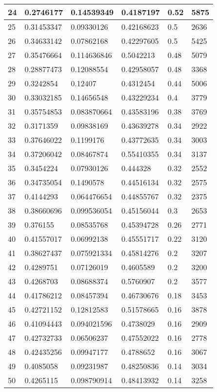 \begin{longtable}{|l|l|l|l|l|l|}
24 & 0.2746177 & 0.14539349 & 0.4187197 & 0.52 & 5875 \\ \hline 
25 & 0.31453347 & 0.09330126 & 0.42168623 & 0.5 & 2636 \\ \hline 
26 & 0.34633142 & 0.07862168 & 0.42297605 & 0.5 & 5425 \\ \hline 
27 & 0.35476664 & 0.114636846 & 0.5042213 & 0.48 & 5079 \\ \hline 
28 & 0.28877473 & 0.12088554 & 0.42958057 & 0.48 & 3368 \\ \hline 
29 & 0.3242854 & 0.12407 & 0.4312454 & 0.44 & 5006 \\ \hline 
30 & 0.33032185 & 0.14656548 & 0.43229234 & 0.4 & 3779 \\ \hline 
31 & 0.35754853 & 0.083870664 & 0.43583196 & 0.38 & 3769 \\ \hline 
32 & 0.3171359 & 0.09838169 & 0.43639278 & 0.34 & 2922 \\ \hline 
33 & 0.37646022 & 0.1199176 & 0.43772635 & 0.34 & 3003 \\ \hline 
34 & 0.37206042 & 0.08467874 & 0.55410355 & 0.34 & 3137 \\ \hline 
35 & 0.3454224 & 0.07930126 & 0.444328 & 0.32 & 2552 \\ \hline 
36 & 0.34735054 & 0.1490578 & 0.44516134 & 0.32 & 2575 \\ \hline 
37 & 0.4144293 & 0.064476654 & 0.44855767 & 0.32 & 2375 \\ \hline 
38 & 0.38660696 & 0.099536054 & 0.45156044 & 0.3 & 2653 \\ \hline 
39 & 0.376155 & 0.08535768 & 0.45394728 & 0.26 & 2771 \\ \hline 
40 & 0.41557017 & 0.06992138 & 0.45551717 & 0.22 & 3120 \\ \hline 
41 & 0.38627437 & 0.075921334 & 0.45814276 & 0.2 & 3207 \\ \hline 
42 & 0.4289751 & 0.07126019 & 0.4605589 & 0.2 & 3200 \\ \hline 
43 & 0.4268703 & 0.08688374 & 0.5760907 & 0.2 & 3577 \\ \hline 
44 & 0.41786212 & 0.08457394 & 0.46730676 & 0.18 & 3453 \\ \hline 
45 & 0.42721152 & 0.12812583 & 0.51578665 & 0.16 & 3878 \\ \hline 
46 & 0.41094443 & 0.094021596 & 0.4738029 & 0.16 & 2909 \\ \hline 
47 & 0.42732733 & 0.06506237 & 0.47552022 & 0.16 & 2778 \\ \hline 
48 & 0.42435256 & 0.09947177 & 0.4788652 & 0.16 & 3067 \\ \hline 
49 & 0.4085058 & 0.09231987 & 0.48250836 & 0.14 & 3034 \\ \hline 
50 & 0.4265115 & 0.098790914 & 0.48413932 & 0.14 & 3258 \\ \hline 
\end{longtable}